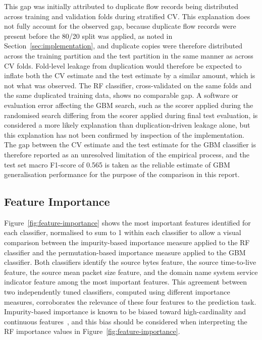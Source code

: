 \documentclass[conference,10pt]{IEEEtran}
\begin{document}
This gap was initially attributed to duplicate flow records being distributed across training and validation folds during stratified CV. This explanation does not fully account for the observed gap, because duplicate flow records were present before the 80/20 split was applied, as noted in Section~\ref{sec:implementation}, and duplicate copies were therefore distributed across the training partition and the test partition in the same manner as across CV folds. Fold-level leakage from duplication would therefore be expected to inflate both the CV estimate and the test estimate by a similar amount, which is not what was observed. The RF classifier, cross-validated on the same folds and the same duplicated training data, shows no comparable gap. A software or evaluation error affecting the GBM search, such as the scorer applied during the randomised search differing from the scorer applied during final test evaluation, is considered a more likely explanation than duplication-driven leakage alone, but this explanation has not been confirmed by inspection of the implementation. The gap between the CV estimate and the test estimate for the GBM classifier is therefore reported as an unresolved limitation of the empirical process, and the test set macro F1-score of 0.565 is taken as the reliable estimate of GBM generalisation performance for the purpose of the comparison in this report.

\subsection{Feature Importance}
Figure~\ref{fig:feature-importance} shows the most important features identified for each classifier, normalised to sum to 1 within each classifier to allow a visual comparison between the impurity-based importance measure applied to the RF classifier and the permutation-based importance measure applied to the GBM classifier. Both classifiers identify the source bytes feature, the source time-to-live feature, the source mean packet size feature, and the domain name system service indicator feature among the most important features. This agreement between two independently tuned classifiers, computed using different importance measures, corroborates the relevance of these four features to the prediction task. Impurity-based importance is known to be biased toward high-cardinality and continuous features~\cite{strobl2007bias}, and this bias should be considered when interpreting the RF importance values in Figure~\ref{fig:feature-importance}.
\end{document}
